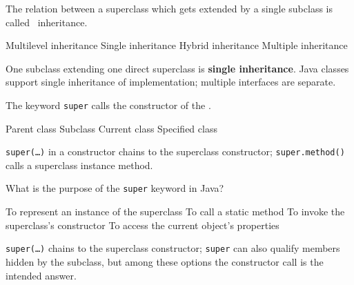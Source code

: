 \question[4]
The relation between a superclass which gets extended by a single subclass is called \blank[4em]\ inheritance.
\begin{choices}
  \choice Multilevel inheritance
  \CorrectChoice Single inheritance
  \choice Hybrid inheritance
  \choice Multiple inheritance
\end{choices}
\begin{solution}
  One subclass extending one direct superclass is \textbf{single inheritance}. Java classes support single inheritance of implementation; multiple interfaces are separate.
\end{solution}

\question[4]
The keyword \texttt{super} calls the constructor of the \blank[6em].
\begin{choices}
  \CorrectChoice Parent class
  \choice Subclass
  \choice Current class
  \choice Specified class
\end{choices}
\begin{solution}
  \texttt{super(\ldots)} in a constructor chains to the superclass constructor; \texttt{super.method()} calls a superclass instance method.
\end{solution}

\question[4]
What is the purpose of the \texttt{super} keyword in Java?
\begin{choices}
  \choice To represent an instance of the superclass
  \choice To call a static method
  \CorrectChoice To invoke the superclass's constructor
  \choice To access the current object's properties
\end{choices}
\begin{solution}
  \texttt{super(\ldots)} chains to the superclass constructor; \texttt{super} can also qualify members hidden by the subclass, but among these options the constructor call is the intended answer.
\end{solution}

\newpage

